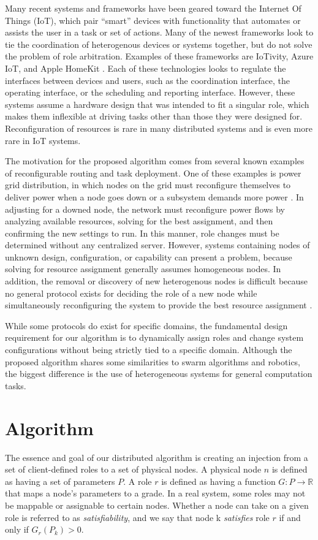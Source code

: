 \documentclass[11pt]{article}
\begin{document}
\begin{multicols}{2}
Many recent systems and frameworks have been geared toward the Internet Of Things (IoT), which pair ``smart'' devices with functionality that automates or assists the user in a task or set of actions.  Many of the newest frameworks look to tie the coordination of heterogenous devices or systems together, but do not solve the problem of role arbitration.  Examples of these frameworks are IoTivity, Azure IoT, and Apple HomeKit \cite{iotivity} \cite{azure}.  Each of these technologies looks to regulate the interfaces between devices and users, such as the coordination interface, the operating interface, or the scheduling and reporting interface. However, these systems assume a hardware design that was intended to fit a singular role, which makes them inflexible at driving tasks other than those they were designed for. Reconfiguration of resources is rare in many distributed systems and is even more rare in IoT systems.

The motivation for the proposed algorithm comes from several known examples of reconfigurable routing and task deployment.  One of these examples is power grid distribution, in which nodes on the grid must reconfigure themselves to deliver power when a node goes down or a subsystem demands more power \cite{loadb}.  In adjusting for a downed node, the network must reconfigure power flows by analyzing available resources, solving for the best assignment, and then confirming the new settings to run.  In this manner, role changes must be determined without any centralized server.  However, systems containing nodes of unknown design, configuration, or capability can present a problem, because solving for resource assignment generally assumes homogeneous nodes.  In addition, the removal or discovery of new heterogenous nodes is difficult because no general protocol exists for deciding the role of a new node while simultaneously reconfiguring the system to provide the best resource assignment \cite{mesh}.

While some protocols do exist for specific domains, the fundamental design requirement for our algorithm is to dynamically assign roles and change system configurations without being strictly tied to a specific domain. Although the proposed algorithm shares some similarities to swarm algorithms and robotics, the biggest difference is the use of heterogeneous systems for general computation tasks.

\section{Algorithm}
The essence and goal of our distributed algorithm is creating an injection from a set of client-defined roles to a set of physical nodes. A physical node $n$ is defined as having a set of parameters $P$. A role $r$ is defined as having a function $G: P \rightarrow \mathbb{R}$ that maps a node's parameters to a grade. In a real system, some roles may not be mappable or assignable to certain nodes. Whether a node can take on a given role is referred to as \textit{satisfiability}, and we say that node k \textit{satisfies} role $r$ if and only if $G_{r}(P_{k}) > 0$.


\end{multicols}
\end{document}
